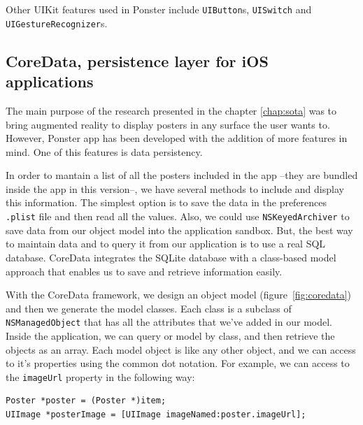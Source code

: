 Other UIKit features used in Ponster include \texttt{UIButton}s, \texttt{UISwitch}
and \texttt{UIGestureRecognizer}s. 

\subsection{CoreData, persistence layer for iOS applications}
The main purpose of the research presented in the chapter \ref{chap:sota} was to
bring augmented reality to display posters in any surface the user wants
to. However, Ponster app has been developed with the addition of more features in
mind. One of this features is data persistency.

In order to mantain a list of all the posters included in the app --they are bundled
inside the app in this version--, we have several methods to include and display
this information. The simplest option is to save the data in the preferences
\texttt{.plist} file and then read all the values. Also, we could use
\texttt{NSKeyedArchiver} to save data from our object model into the application
sandbox. But, the best way to maintain data and to
query it from our application is to use a real SQL database. CoreData integrates
the SQLite database with a class-based model approach that enables us to save and
retrieve information easily.

With the CoreData framework, we design an object model (figure~\ref{fig:coredata}) and then we
generate the model classes. Each class is a subclass of \texttt{NSManagedObject}
that has all the attributes that we've added in our model. Inside the application,
we can query or model by class, and then retrieve the objects as an array. Each
model object is like any other object, and we can access to it's properties using
the common dot notation. For example, we can access to the \texttt{imageUrl}
property in the following way:

\begin{verbatim}
Poster *poster = (Poster *)item;
UIImage *posterImage = [UIImage imageNamed:poster.imageUrl];
\end{verbatim}


